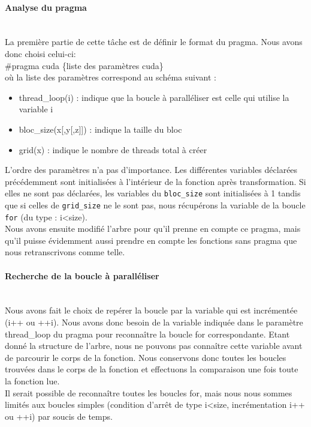 \documentclass{article}
\begin{document}
	\paragraph{Analyse du pragma}
	~~\\
	\indent
	La première partie de cette tâche est de définir le format du pragma. Nous avons donc choisi celui-ci:
	\\\#pragma cuda \{liste des paramètres cuda\}
	\\où la liste des paramètres correspond au schéma suivant :
	\begin{itemize}
		\item thread\_loop(i) : indique que la boucle à paralléliser est celle qui utilise la variable i
		\item bloc\_size(x[,y[,z]]) : indique la taille du bloc
		\item grid(x) : indique le nombre de threads total à créer
	\end{itemize}
	L'ordre des paramètres n'a pas d'importance.
	Les différentes variables déclarées précédemment sont initialisées à l'intérieur de la fonction après transformation.
	Si elles ne sont pas déclarées, les variables du \verb|bloc_size| sont initialisées à 1 tandis que si celles de \verb|grid_size| ne le sont pas, nous récupérons la variable de la boucle \verb|for| (du type : i<size).
	\\Nous avons ensuite modifié l'arbre pour qu'il prenne en compte ce pragma, mais qu'il puisse évidemment aussi prendre en compte les fonctions sans pragma que nous retranscrivons comme telle.
	
	
	\paragraph{Recherche de la boucle à paralléliser}
	~~\\
	\indent
	Nous avons fait le choix de repérer la boucle par la variable qui est incrémentée (i++ ou ++i). Nous avons donc besoin de la variable indiquée dans le paramètre thread\_loop du pragma pour reconnaître la boucle for correspondante. Etant donné la structure de l'arbre, nous ne pouvons pas connaître cette variable avant de parcourir le corps de la fonction. Nous conservons donc toutes les boucles trouvées dans le corps de la fonction et effectuons la comparaison une fois toute la fonction lue.
	\\Il serait possible de reconnaître toutes les boucles for, mais nous nous sommes limités aux boucles simples (condition d'arrêt de type i\textless size, incrémentation i++ ou ++i) par soucis de temps.
	
\end{document}
